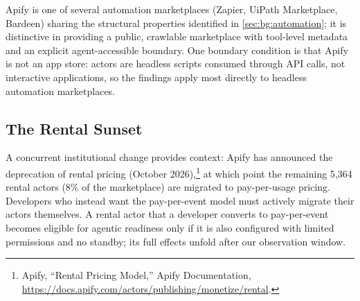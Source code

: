 Apify is one of several automation marketplaces (Zapier, UiPath Marketplace,
Bardeen) sharing the structural properties identified in
\autoref{sec:bg:automation}; it is distinctive in providing a public, crawlable
marketplace with tool-level metadata and an explicit agent-accessible boundary.
One boundary condition is that Apify is not an app store: actors are headless
scripts consumed through API calls, not interactive applications, so the
findings apply most directly to headless automation marketplaces.

\subsection{The Rental Sunset}

A concurrent institutional change provides context: Apify has announced the
deprecation of rental pricing (October 2026),\footnote{Apify, ``Rental Pricing
Model,'' Apify Documentation,
\url{https://docs.apify.com/actors/publishing/monetize/rental}.} at which point
the remaining 5{,}364 rental actors (8\% of the marketplace) are migrated to
pay-per-usage pricing. Developers who instead want the pay-per-event model must
actively migrate their actors themselves. A rental actor that a developer
converts to pay-per-event becomes eligible for agentic readiness only if it is
also configured with limited permissions and no standby; its full effects unfold
after our observation window.
